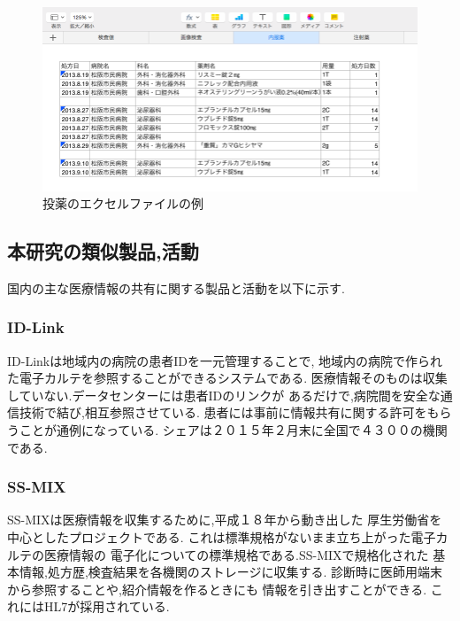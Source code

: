  \begin{figure}[htbp]
    \begin{center}
      \includegraphics[width=13cm, bb=0 0 850 411]{./gazou/excel-data-medicine.png}
    \end{center}
    \caption{投薬のエクセルファイルの例}
    \label{excel-data-medicine}
  \end{figure}



\subsection{本研究の類似製品,活動}
  国内の主な医療情報の共有に関する製品と活動を以下に示す.

  \subsubsection{ID-Link}
    ID-Linkは地域内の病院の患者IDを一元管理することで,
    地域内の病院で作られた電子カルテを参照することができるシステムである.
    医療情報そのものは収集していない.データセンターには患者IDのリンクが
    あるだけで,病院間を安全な通信技術で結び,相互参照させている.
    患者には事前に情報共有に関する許可をもらうことが通例になっている.
    シェアは２０１５年２月末に全国で４３００の機関である.
    \cite{bibi12}

  \subsubsection{SS-MIX}
    SS-MIXは医療情報を収集するために,平成１８年から動き出した
    厚生労働省を中心としたプロジェクトである.
    これは標準規格がないまま立ち上がった電子カルテの医療情報の
    電子化についての標準規格である.SS-MIXで規格化された
    基本情報,処方歴,検査結果を各機関のストレージに収集する.
    診断時に医師用端末から参照することや,紹介情報を作るときにも
    情報を引き出すことができる.
    これにはHL7が採用されている.
    \cite{bibi1}\cite{bibi7}

